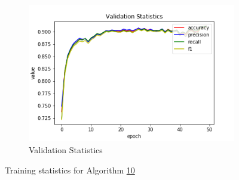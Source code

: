 \begin{figure}[h!]
\begin{subfigure}[b]{0.35\linewidth}
    \includegraphics[width=\linewidth]{images/cae_online_lstm/caelstm_section_lstm_training_uniform_random_fill_10000_block_map_10000_house_10000_model_validation_stats.png}
     \caption{Validation Statistics}
  \end{subfigure}
  \caption{Training statistics for Algorithm \hyperref[tab: app_evalalgorithms]{10}}
  \label{fig: train_olnine_lstm_10}
\end{figure}

\pagebreak